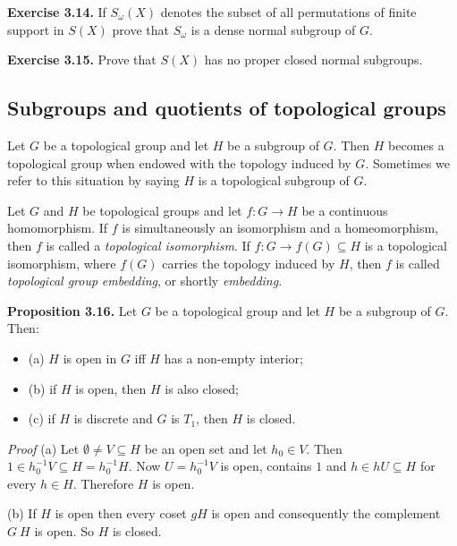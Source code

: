 \documentclass[12pt]{article}
\begin{document}
    \textbf{Exercise 3.14.} If $S_\omega (X)$ denotes the subset of all permutations of finite support in $S(X)$ prove that $S_\omega$ is a
    dense normal subgroup of $G$.


    \textbf{Exercise 3.15.} Prove that $S(X)$ has no proper closed normal subgroups.


    \subsection{Subgroups and quotients of topological groups}


        Let $G$ be a topological group and let $H$ be a subgroup of $G$. Then $H$ becomes a topological group when endowed
    with the topology induced by $G$. Sometimes we refer to this situation by saying $H$ is a topological subgroup of
    $G$.


        Let $G$ and $H$ be topological groups and let $f : G \to H$ be a continuous homomorphism. If $f$ is simultaneously
    an isomorphism and a homeomorphism, then $f$ is called a \emph{topological isomorphism}. If $f : G \to f(G) \subseteq H$ is
    a topological isomorphism, where $f(G)$ carries the topology induced by $H$, then $f$ is called \emph{topological group}
    \emph{embedding}, or shortly \emph{embedding}.


    \textbf{Proposition 3.16.} Let $G$ be a topological group and let $H$ be a subgroup of $G$. Then:


        \begin{itemize}
            \item (a) $H$ is open in $G$ iff $H$ has a non-empty interior;

            \item (b) if $H$ is open, then $H$ is also closed;
            
            \item (c) if $H$ is discrete and $G$ is $T_1$, then $H$ is closed.
        \end{itemize}  


        \emph{Proof} (a) Let $\emptyset \neq V \subseteq H$ be an open set and let $h_0 \in V$. Then $1 \in h^{-1}_0 V \subseteq H = h^{-1}_0 H$. Now $U = h^{-1}_0 V$ is
        open, contains $1$ and $h \in hU \subseteq H$ for every $h \in H$. Therefore $H$ is open.


        (b) If $H$ is open then every coset $gH$ is open and consequently the complement $G \ H$ is open. So $H$ is
            closed.
\end{document}
